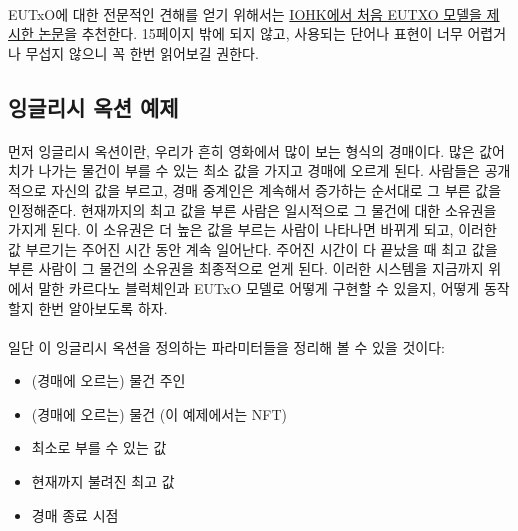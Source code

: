\documentclass[a4paper, 11pt]{article}
\begin{document}
    \paragraph{} EUTxO에 대한 전문적인 견해를 얻기 위해서는 \href{https://iohk.io/en/research/library/papers/the-extended-utxo-model/}{IOHK에서 처음 EUTXO 모델을 제시한 논문}을 추천한다. 15페이지 밖에 되지 않고, 사용되는 단어나 표현이 너무 어렵거나 무섭지 않으니 꼭 한번 읽어보길 권한다. 
 
    \subsection{잉글리시 옥션 예제}
    
    \paragraph{} 먼저 잉글리시 옥션이란, 우리가 흔히 영화에서 많이 보는 형식의 경매이다. 많은 값어치가 나가는 물건이 부를 수 있는 최소 값을 가지고 경매에 오르게 된다. 사람들은 공개적으로 자신의 값을 부르고, 경매 중계인은 계속해서 증가하는 순서대로 그 부른 값을 인정해준다. 현재까지의 최고 값을 부른 사람은 일시적으로 그 물건에 대한 소유권을 가지게 된다. 이 소유권은 더 높은 값을 부르는 사람이 나타나면 바뀌게 되고, 이러한 값 부르기는 주어진 시간 동안 계속 일어난다. 주어진 시간이 다 끝났을 때 최고 값을 부른 사람이 그 물건의 소유권을 최종적으로 얻게 된다. 이러한 시스템을 지금까지 위에서 말한 카르다노 블럭체인과 EUTxO 모델로 어떻게 구현할 수 있을지, 어떻게 동작할지 한번 알아보도록 하자.

    \paragraph{} 일단 이 잉글리시 옥션을 정의하는 파라미터들을 정리해 볼 수 있을 것이다:
    \begin{itemize}
        \item (경매에 오르는) 물건 주인 
        \item (경매에 오르는) 물건 (이 예제에서는 NFT)
        \item 최소로 부를 수 있는 값
        \item 현재까지 불려진 최고 값
        \item 경매 종료 시점
    \end{itemize}
\end{document}

